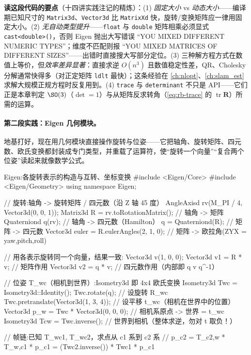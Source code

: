 \noindent\textbf{读这段代码的要点}（十四讲实践注记的精炼）：(1) \emph{固定大小} vs \emph{动态大小}——编译期已知尺寸的 \texttt{Matrix3d}、\texttt{Vector3d} 比 \texttt{MatrixXd} 快，旋转/变换矩阵应一律用固定大小。(2) \emph{无自动类型提升}——\texttt{float} 与 \texttt{double} 矩阵相乘必须显式 \texttt{cast<double>()}，否则 Eigen 抛出大写错误 “YOU MIXED DIFFERENT NUMERIC TYPES”；维度不匹配则报 “YOU MIXED MATRICES OF DIFFERENT SIZES”——出错时直接搜大写部分定位。(3) 三种解方程方式在数值上等价，但\emph{效率差异显著}：直接求逆 $O(n^3)$ 且数值稳定性差，QR、Cholesky 分解通常快得多（对正定矩阵 \texttt{ldlt} 最快）；这条经验在 \cref{ch:nlopt}、\cref{ch:slam_est} 求解大规模正规方程时反复用到。(4) \texttt{trace} 与 \texttt{determinant} 不只是 API——它们正是本章判定 $\SO(3)$（$\det=1$）与从矩阵反求转角（\cref{eq:rb-trace} 的 $\operatorname{tr}\mathbf{R}$）所需的运算。

\paragraph{第二段实践：Eigen 几何模块。}地基打好，现在用几何模块直接操作旋转与位姿——它把轴角、旋转矩阵、四元数、欧氏变换都封装成专门类型，并重载了运算符，使“旋转一个向量”“复合两个位姿”读起来就像数学公式。

\begin{codebox}[C++]{Eigen:各旋转表示的构造与互转、坐标变换}
#include <Eigen/Core>
#include <Eigen/Geometry>
using namespace Eigen;

// 旋转:轴角 -> 旋转矩阵 / 四元数（沿 Z 轴 45 度）
AngleAxisd rv(M_PI / 4, Vector3d(0, 0, 1));
Matrix3d   R = rv.toRotationMatrix();         // 轴角 -> 矩阵
Quaterniond q(rv);                            // 轴角 -> 四元数（Hamilton）
q = Quaterniond(R);                           // 矩阵 -> 四元数
Vector3d euler = R.eulerAngles(2, 1, 0);      // 矩阵 -> 欧拉角(ZYX = yaw,pitch,roll)

// 用各表示旋转同一个向量，结果一致:
Vector3d v(1, 0, 0);
Vector3d v1 = R * v;                           // 矩阵作用
Vector3d v2 = q * v;                           // 四元数作用（内部即 q v q^-1）

// 位姿 T_wc（相机到世界）:Isometry3d 即 4x4 欧氏变换
Isometry3d Twc = Isometry3d::Identity();
Twc.rotate(q);                                 // 设旋转 R_wc
Twc.pretranslate(Vector3d(1, 3, 4));           // 设平移 t_wc（相机在世界中的位置）
Vector3d p_w = Twc * Vector3d(0, 0, 0);        // 相机系原点 -> 世界 = t_wc
Isometry3d Tcw = Twc.inverse();                // 世界到相机（整体求逆，勿对 t 取负！）

// 帧链:已知 T_wc1, T_wc2，求点从 c1 系到 c2 系
// p_c2 = T_c2,w * T_w,c1 * p_c1 = (Twc2.inverse()) * Twc1 * p_c1
\end{codebox}

